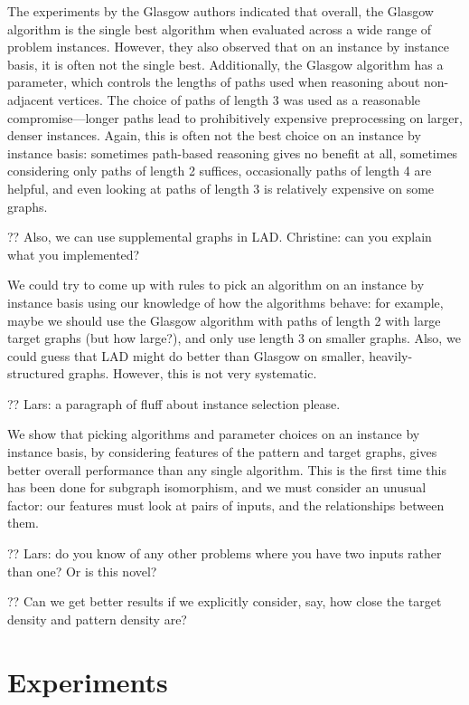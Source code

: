 \documentclass{llncs}
\begin{document}
\noindent The experiments by the Glasgow authors indicated that overall, the Glasgow algorithm is
the single best algorithm when evaluated across a wide range of problem instances. However, they
also observed that on an instance by instance basis, it is often not the single best.  Additionally,
the Glasgow algorithm has a parameter, which controls the lengths of paths used when reasoning about
non-adjacent vertices.  The choice of paths of length 3 was used as a reasonable compromise---longer
paths lead to prohibitively expensive preprocessing on larger, denser instances. Again, this is
often not the best choice on an instance by instance basis: sometimes path-based reasoning gives no
benefit at all, sometimes considering only paths of length 2 suffices, occasionally paths of
length 4 are helpful, and even looking at paths of length 3 is relatively expensive on some graphs.

?? Also, we can use supplemental graphs in LAD. Christine: can you explain what you implemented?

We could try to come up with rules to pick an algorithm on an instance by instance basis using our
knowledge of how the algorithms behave: for example, maybe we should use the Glasgow algorithm with
paths of length 2 with large target graphs (but how large?), and only use length 3 on smaller
graphs. Also, we could guess that LAD might do better than Glasgow on smaller, heavily-structured
graphs. However, this is not very systematic.

?? Lars: a paragraph of fluff about instance selection please.

We show that picking algorithms and parameter choices on an instance by instance basis, by
considering features of the pattern and target graphs, gives better overall performance than any
single algorithm. This is the first time this has been done for subgraph isomorphism, and we must
consider an unusual factor: our features must look at pairs of inputs, and the relationships between
them.

?? Lars: do you know of any other problems where you have two inputs rather than one? Or is this
novel?

?? Can we get better results if we explicitly consider, say, how close the target density and
pattern density are?

\section{Experiments}
\end{document}
